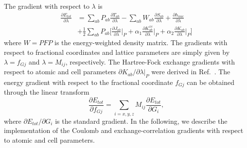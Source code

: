\documentclass[prl,twocolumn,showpacs,twocolumngrid,superbib]{revtex4}
\def\Tr{{\rm Tr}}
\begin{document}

The gradient with respect to $\lambda$ is 
\begin{equation}
  \begin{split}
    \frac{\partial E_{tot}}{\partial \lambda}&=\sum_{ab}P_{ab}\frac{\partial T_{ab}}{\partial \lambda}
    -\sum_{ab}W_{ab}\frac{\partial S_{ab}}{\partial \lambda}+\frac{\partial h_{nuc}}{\partial \lambda}\\
    &+\frac{1}{2}\sum_{ab}P_{ab}\bigg[\frac{\partial J_{ab}}{\partial \lambda}\bigg|_P
    +\alpha_1 \frac{\partial K^{xc}_{ab}}{\partial \lambda}\bigg|_P
    +\alpha_2 \frac{\partial K_{ab}}{\partial \lambda}\bigg|_P\bigg]
  \end{split}
\end{equation}
where $W=PFP$ is the energy-weighted density matrix.
The gradients with respect to fractional coordinates and lattice parameters 
are simply given by $\lambda=f_{Gj}$ and $\lambda=M_{ij}$, respectively.
The Hartree-Fock exchange gradients with respect to atomic and cell parameters
$\partial K_{ab}/\partial \lambda |_P$ were derived in Ref.~\cite{VWeber05b}.
The energy gradient with respect to the fractional coordinate
$f_{Gj}$ can be obtained through the linear transform
\begin{equation*}
 \frac{\partial E_{tot}}{\partial f_{Gj}}=\sum_{i=x,y,z}M_{ij}\frac{\partial E_{tot}}{\partial G_i},
\end{equation*}
where $\partial E_{tot}/\partial G_i$ is the standard gradient.
In the following, we describe the implementation of the Coulomb and exchange-correlation
gradients with respect to atomic and cell parameters.
\end{document}
